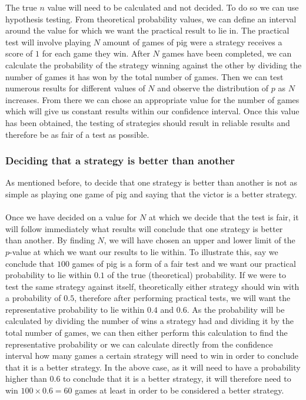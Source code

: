 \documentclass[a4paper,titlepage]{article}
\begin{document}
The true $n$ value will need to be calculated and not decided. To do so we can use hypothesis testing. From theoretical probability values, we can define an interval around the value for which we want the practical result to lie in. The practical test will involve playing $N$ amount of games of pig were a strategy receives a score of $1$ for each game they win. After $N$ games have been completed, we can calculate the probability of the strategy winning against the other by dividing the number of games it has won by the total number of games. Then we can test numerous results for different values of $N$ and observe the distribution of $p$ as $N$ increases. From there we can chose an appropriate value for the number of games which will give us constant results within our confidence interval. Once this value has been obtained, the testing of strategies should result in reliable results and therefore be as fair of a test as possible.
 \subsubsection{Deciding that a strategy is better than another}
As mentioned before, to decide that one strategy is better than another is not as simple as playing one game of pig and saying that the victor is a better strategy.\\ \\
Once we have decided on a value for $N$ at which we decide that the test is fair, it will follow immediately what results will conclude that one strategy is better than another. By finding $N$, we will have chosen an upper and lower limit of the $p$-value at which we want our results to lie within. To illustrate this, say we conclude that $100$ games of pig is a form of a fair test and we want our practical probability to lie within $0.1$ of the true (theoretical) probability. If we were to test the same strategy against itself, theoretically either strategy should win with a probability of $0.5$, therefore after performing practical tests, we will want the representative probability to lie within $0.4$ and $0.6$. As the probability will be calculated by dividing the number of wins a strategy had and dividing it by the total number of games, we can then either perform this calculation to find the representative probability or we can calculate directly from the confidence interval how many games a certain strategy will need to win in order to conclude that it is a better strategy. In the above case, as it will need to have a probability higher than $0.6$ to conclude that it is a better strategy, it will therefore need to win $100\times0.6=60$ games at least in order to be considered a better strategy.
\end{document}
